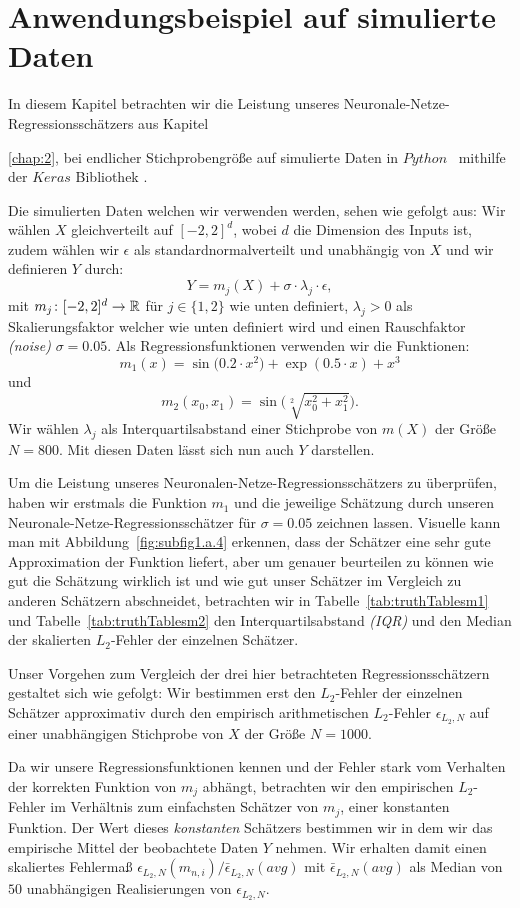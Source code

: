 \chapter{Anwendungsbeispiel auf simulierte Daten}
\label{chap:4}

In diesem Kapitel betrachten wir die Leistung unseres Neuronale-Netze-Regressionsschätzers aus Kapitel~{\ref{chap:2}, bei endlicher Stichprobengröße auf simulierte Daten in $Python$~\cite[Version 3.7.3]{van1995python} mithilfe der $Keras$ Bibliothek \cite{chollet2015keras}.

Die simulierten Daten welchen wir verwenden werden, sehen wie gefolgt aus:
Wir wählen $X$ gleichverteilt auf $[-2, 2]^d$, wobei $d$ die Dimension des Inputs ist, zudem wählen wir $\epsilon$ als standardnormalverteilt und unabhängig von $X$ und wir definieren $Y$ durch:
$$Y = m_j(X) + \sigma \cdot \lambda_j \cdot \epsilon,$$ 
mit $m_j \colon [-2, 2]^d \to \mathbb{R}$ für  $j \in \{1, 2\}$ wie unten definiert, $\lambda_j > 0$ als Skalierungsfaktor welcher wie unten definiert wird und einen Rauschfaktor \emph{(noise)} $\sigma = 0.05.$ Als Regressionsfunktionen verwenden wir die Funktionen:
$$ m_1(x) =  \sin\big(0.2 \cdot x^2\big) + \exp(0.5 \cdot x) + x^3$$
und
$$ m_2(x_0, x_1) = \sin\big(\sqrt[2]{x_0^2 + x_1^2}\big).$$
Wir wählen $\lambda_j$ als Interquartilsabstand einer Stichprobe von $m(X)$ der Größe $N = 800$. Mit diesen Daten lässt sich nun auch $Y$ darstellen.

Um die Leistung unseres Neuronalen-Netze-Regressionsschätzers zu überprüfen, haben wir erstmals die Funktion $m_1$ und die jeweilige Schätzung durch unseren Neuronale-Netze-Regressionsschätzer für $\sigma = 0.05$ zeichnen lassen. 
Visuelle kann man mit Abbildung~\ref{fig:subfig1.a.4} erkennen, dass der Schätzer eine sehr gute Approximation der Funktion liefert, aber um genauer beurteilen zu können wie gut die Schätzung wirklich ist und wie gut unser Schätzer im Vergleich zu anderen Schätzern abschneidet, betrachten wir in Tabelle~\ref{tab:truthTablesm1} und Tabelle~\ref{tab:truthTablesm2} den Interquartilsabstand \emph{(IQR)} und den Median der skalierten $L_2$-Fehler der einzelnen Schätzer. 

Unser Vorgehen zum Vergleich der drei hier betrachteten Regressionsschätzern gestaltet sich wie gefolgt:
Wir bestimmen erst den $L_2$-Fehler der einzelnen Schätzer approximativ durch den empirisch arithmetischen $L_2$-Fehler $\epsilon_{L_2,N}$ auf einer unabhängigen Stichprobe von $X$ der Größe $N = 1000$. 

Da wir unsere Regressionsfunktionen kennen und der Fehler stark vom Verhalten der korrekten Funktion von $m_j$ abhängt, betrachten wir den empirischen $L_2$-Fehler im Verhältnis zum einfachsten Schätzer von $m_j$, einer konstanten Funktion. Der Wert dieses \textit{konstanten} Schätzers bestimmen wir in dem wir das empirische Mittel der beobachtete Daten $Y$ nehmen. Wir erhalten damit einen skaliertes Fehlermaß $\epsilon_{L_2,N}(m_{n,i})/\bar{\epsilon}_{L_2,N}(avg)$ mit $\bar{\epsilon}_{L_2,N}(avg)$ als Median von $50$ unabhängigen Realisierungen von $\epsilon_{L_2,N}$. 

}
